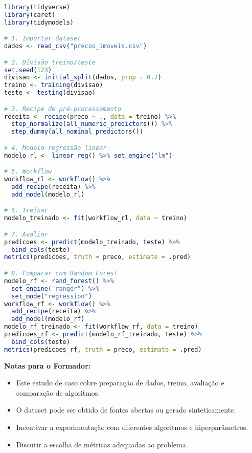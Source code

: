\begin{lstlisting}[language=R]
library(tidyverse)
library(caret)
library(tidymodels)

# 1. Importar dataset
dados <- read_csv("precos_imoveis.csv")

# 2. Divisão treino/teste
set.seed(123)
divisao <- initial_split(dados, prop = 0.7)
treino <- training(divisao)
teste <- testing(divisao)

# 3. Recipe de pré-processamento
receita <- recipe(preco ~ ., data = treino) %>%
  step_normalize(all_numeric_predictors()) %>%
  step_dummy(all_nominal_predictors())

# 4. Modelo regressão linear
modelo_rl <- linear_reg() %>% set_engine("lm")

# 5. Workflow
workflow_rl <- workflow() %>%
  add_recipe(receita) %>%
  add_model(modelo_rl)

# 6. Treinar
modelo_treinado <- fit(workflow_rl, data = treino)

# 7. Avaliar
predicoes <- predict(modelo_treinado, teste) %>%
  bind_cols(teste)
metrics(predicoes, truth = preco, estimate = .pred)

# 8. Comparar com Random Forest
modelo_rf <- rand_forest() %>%
  set_engine("ranger") %>%
  set_mode("regression")
workflow_rf <- workflow() %>%
  add_recipe(receita) %>%
  add_model(modelo_rf)
modelo_rf_treinado <- fit(workflow_rf, data = treino)
predicoes_rf <- predict(modelo_rf_treinado, teste) %>%
  bind_cols(teste)
metrics(predicoes_rf, truth = preco, estimate = .pred)
\end{lstlisting}

\textbf{Notas para o Formador:}
\begin{itemize}
  \item Este estudo de caso cobre preparação de dados, treino, avaliação e comparação de algoritmos.
  \item O dataset pode ser obtido de fontes abertas ou gerado sinteticamente.
  \item Incentivar a experimentação com diferentes algoritmos e hiperparâmetros.
  \item Discutir a escolha de métricas adequadas ao problema.
\end{itemize}

